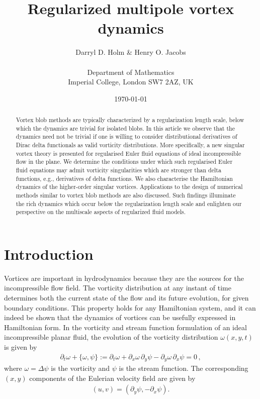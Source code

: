 \documentclass[12pt]{amsart}
\title{Regularized multipole vortex dynamics}
\author[D.D. Holm \& H.O. Jacobs]{Darryl D. Holm \& Henry O. Jacobs\\ \\
Department of Mathematics\\
Imperial College, London SW7 2AZ, UK}
\date{\today}
\theoremstyle{remark}
\begin{document}
\begin{abstract}
Vortex blob methods are typically characterized by a regularization length scale, below which the dynamics are trivial for isolated blobs.
In this article we observe that the dynamics need not be trivial if one is willing to consider distributional derivatives of Dirac delta functionals as valid vorticity distributions.
More specifically, a new singular vortex theory is presented for regularised Euler fluid equations of ideal incompressible flow in the plane.
We determine the conditions under which such regularised Euler fluid equations may admit vorticity singularities which are stronger than delta functions, e.g., derivatives of delta functions.
We also characterise the Hamiltonian dynamics of the higher-order singular vortices.
Applications to the design of numerical methods similar to vortex blob methods are also discussed.
Such findings illuminate the rich dynamics which occur below the regularization length scale and
enlighten our perspective on the multiscale aspects of regularized fluid models.
\end{abstract}

\maketitle


\section{Introduction}
\label{sec:intro}
Vortices are important in hydrodynamics because they are the sources for the incompressible flow field. The vorticity distribution at any instant of time determines both the current state of the flow and its future evolution, for given boundary conditions. This property holds for any Hamiltonian system, and it can indeed be shown that the dynamics of vortices can be usefully expressed in Hamiltonian form. In the vorticity and stream function formulation of an ideal incompressible planar fluid, the evolution of the vorticity distribution $\omega(x,y,t)$ is given by
\begin{align}
  \partial_t \omega + \{\omega,\psi\} := 
  \partial_t \omega + \partial_x  \omega\,  \partial_y \psi
  - \partial_y \omega \, \partial_x \psi = 0\,, \label{eq:vorticity}
\end{align}
where $\omega = \Delta \psi$ is the vorticity and $\psi$ is the stream function.
The corresponding $(x,y)$ components of the Eulerian velocity field are given by
\begin{align*}
	 (u,v) = (\partial_y \psi , - \partial_x \psi).
\end{align*}
\end{document}
